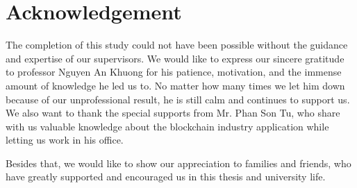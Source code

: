 \chapter*{Acknowledgement}
\thispagestyle{empty}
\label{Acknowledgement}
\hspace*{5cm}

The completion of this study could not have been possible without the guidance and expertise of our supervisors. We would like to express our sincere gratitude to professor Nguyen An Khuong for his patience, motivation, and the immense amount of knowledge he led us to. No matter how many times we let him down because of our unprofessional result, he is still calm and continues to support us. We also want to thank the special supports from Mr. Phan Son Tu, who share with us valuable knowledge about the blockchain industry application while letting us work in his office.

Besides that, we would like to show our appreciation to families and friends, who have greatly supported and encouraged us in this thesis and university life.

\cleardoublepage
